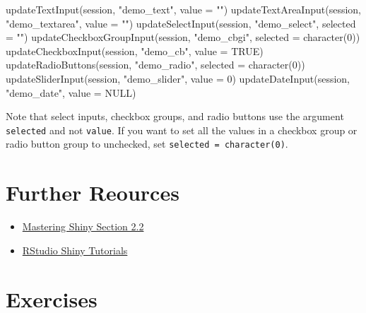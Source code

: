 \documentclass[
]{book}
\newenvironment{Shaded}{\begin{snugshade}}{\end{snugshade}}
\newcommand{\AttributeTok}[1]{\textcolor[rgb]{0.77,0.63,0.00}{#1}}
\newcommand{\ConstantTok}[1]{\textcolor[rgb]{0.00,0.00,0.00}{#1}}
\newcommand{\DecValTok}[1]{\textcolor[rgb]{0.00,0.00,0.81}{#1}}
\newcommand{\FunctionTok}[1]{\textcolor[rgb]{0.00,0.00,0.00}{#1}}
\newcommand{\NormalTok}[1]{#1}
\newcommand{\StringTok}[1]{\textcolor[rgb]{0.31,0.60,0.02}{#1}}
\providecommand{\tightlist}{%
  \setlength{\itemsep}{0pt}\setlength{\parskip}{0pt}}
\begin{document}
\begin{Shaded}
\begin{Highlighting}[]
\FunctionTok{updateTextInput}\NormalTok{(session, }\StringTok{"demo\_text"}\NormalTok{, }\AttributeTok{value =} \StringTok{""}\NormalTok{)}
\FunctionTok{updateTextAreaInput}\NormalTok{(session, }\StringTok{"demo\_textarea"}\NormalTok{, }\AttributeTok{value =} \StringTok{""}\NormalTok{)}
\FunctionTok{updateSelectInput}\NormalTok{(session, }\StringTok{"demo\_select"}\NormalTok{, }\AttributeTok{selected =} \StringTok{""}\NormalTok{)}
\FunctionTok{updateCheckboxGroupInput}\NormalTok{(session, }\StringTok{"demo\_cbgi"}\NormalTok{, }\AttributeTok{selected =} \FunctionTok{character}\NormalTok{(}\DecValTok{0}\NormalTok{))}
\FunctionTok{updateCheckboxInput}\NormalTok{(session, }\StringTok{"demo\_cb"}\NormalTok{, }\AttributeTok{value =} \ConstantTok{TRUE}\NormalTok{)}
\FunctionTok{updateRadioButtons}\NormalTok{(session, }\StringTok{"demo\_radio"}\NormalTok{, }\AttributeTok{selected =} \FunctionTok{character}\NormalTok{(}\DecValTok{0}\NormalTok{))}
\FunctionTok{updateSliderInput}\NormalTok{(session, }\StringTok{"demo\_slider"}\NormalTok{, }\AttributeTok{value =} \DecValTok{0}\NormalTok{)}
\FunctionTok{updateDateInput}\NormalTok{(session, }\StringTok{"demo\_date"}\NormalTok{, }\AttributeTok{value =} \ConstantTok{NULL}\NormalTok{)}
\end{Highlighting}
\end{Shaded}

Note that select inputs, checkbox groups, and radio buttons use the argument \texttt{selected} and not \texttt{value}. If you want to set all the values in a checkbox group or radio button group to unchecked, set \texttt{selected\ =\ character(0)}.

\hypertarget{resources-inputs}{%
\section{Further Reources}\label{resources-inputs}}

\begin{itemize}
\tightlist
\item
  \href{https://mastering-shiny.org/basic-ui.html\#inputs}{Mastering Shiny Section 2.2}
\item
  \href{https://vimeo.com/rstudioinc/review/131218530/212d8a5a7a/\#t=10m41s}{RStudio Shiny Tutorials}
\end{itemize}

\hypertarget{exercises-inputs}{%
\section{Exercises}\label{exercises-inputs}}
\end{document}
